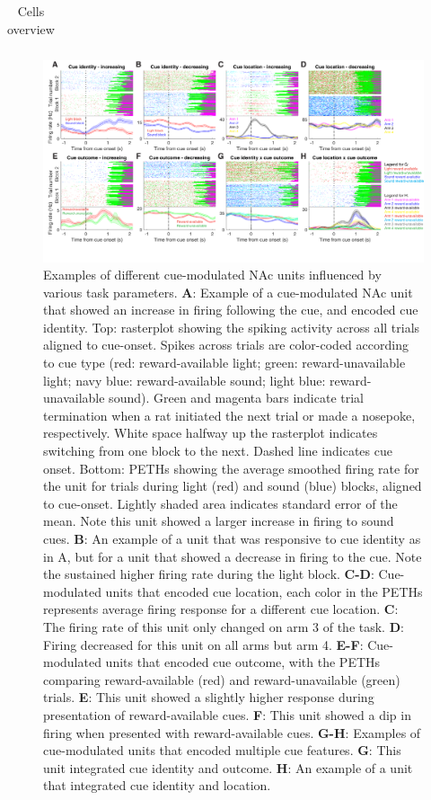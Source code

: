 \documentclass[11pt]{article}
\newcommand{\bsf}[1]{\textbf{#1}}
\begin{document}
{\begin{table}[p]
\begin{tabular}{l c  c c c c}
\end{tabular}
\caption {Cells overview} \label{tbl1} 
\end{table}

\begin{figure}[h]
\centering
\includegraphics[width=\textwidth]{Fig 5 - Neural examples.png}
\caption{Examples of different cue-modulated NAc units influenced by various
  task parameters. \bsf{A}: Example of a cue-modulated NAc unit that showed an
  increase in firing following the cue, and encoded cue identity. Top:
  rasterplot showing the spiking activity across all trials aligned to
  cue-onset. Spikes across trials are color-coded according to cue type (red:
  reward-available light; green: reward-unavailable light; navy blue:
  reward-available sound; light blue: reward-unavailable sound). Green and
  magenta bars indicate trial termination when a rat initiated the next trial or
  made a nosepoke, respectively. White space halfway up the rasterplot indicates
  switching from one block to the next. Dashed line indicates cue onset. Bottom:
  PETHs showing the average smoothed firing rate for the unit for trials during
  light (red) and sound (blue) blocks, aligned to cue-onset. Lightly shaded area
  indicates standard error of the mean. Note this unit showed a larger increase
  in firing to sound cues. \bsf{B}: An example of a unit that was responsive to
  cue identity as in A, but for a unit that showed a decrease in firing to the
  cue. Note the sustained higher firing rate during the light block. \bsf{C-D}:
  Cue-modulated units that encoded cue location, each color in the PETHs
  represents average firing response for a different cue location. \bsf{C}: The
  firing rate of this unit only changed on arm 3 of the task. \bsf{D}: Firing
  decreased for this unit on all arms but arm 4. \bsf{E-F}: Cue-modulated units
  that encoded cue outcome, with the PETHs comparing reward-available (red) and
  reward-unavailable (green) trials. \bsf{E}: This unit showed a slightly higher
  response during presentation of reward-available cues. \bsf{F}: This unit
  showed a dip in firing when presented with reward-available cues. \bsf{G-H}:
  Examples of cue-modulated units that encoded multiple cue features. \bsf{G}:
  This unit integrated cue identity and outcome. \bsf{H}: An example of a unit
  that integrated cue identity and location.}
\label{fig:examples}
\end{figure}

}
\end{document}
